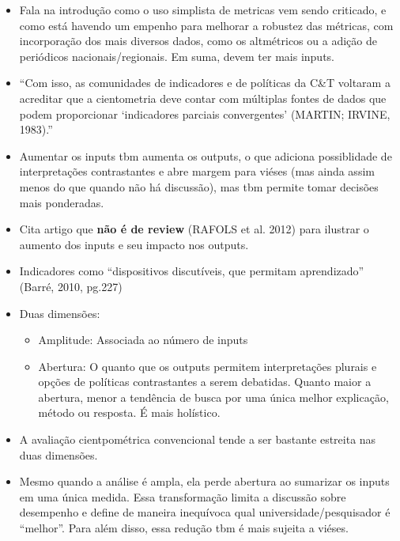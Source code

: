 \documentclass[11pt]{article}
\begin{document}
\begin{itemize}
\item Fala na introdução como o uso simplista de metricas vem sendo criticado, e como está havendo um empenho para melhorar a robustez das métricas, com incorporação dos mais diversos dados, como os altmétricos ou a adição de periódicos nacionais/regionais. Em suma, devem ter mais inputs.

\item ``Com isso, as comunidades de indicadores e de políticas da C\&T voltaram a acreditar que a cientometria deve contar com múltiplas fontes de dados que podem proporcionar ‘indicadores parciais convergentes’ (MARTIN; IRVINE, 1983).''

\item Aumentar os inputs tbm aumenta os outputs, o que adiciona possiblidade de interpretações contrastantes e abre margem para viéses (mas ainda assim menos do que quando não há discussão), mas tbm permite tomar decisões mais ponderadas.

\item Cita artigo que \textbf{não é de review} (RAFOLS et al. 2012) para ilustrar o aumento dos inputs e seu impacto nos outputs.

\item Indicadores como ``dispositivos discutíveis, que permitam aprendizado'' (Barré, 2010, pg.227)

\item Duas dimensões:

\begin{itemize}
\item Amplitude: Associada ao número de inputs

\item Abertura: O quanto que os outputs permitem interpretações plurais e opções de políticas contrastantes a serem debatidas. Quanto maior a abertura, menor a tendência de busca por uma única melhor explicação, método ou resposta. É mais holístico.
\end{itemize}

\item A avaliação cientpométrica convencional tende a ser bastante estreita nas duas dimensões.

\item Mesmo quando a análise é ampla, ela perde abertura ao sumarizar os inputs em uma única medida. Essa transformação limita a discussão sobre desempenho e define de maneira inequívoca qual universidade/pesquisador é ``melhor''. Para além disso, essa redução tbm é mais sujeita a viéses.


\end{itemize}
\end{document}
